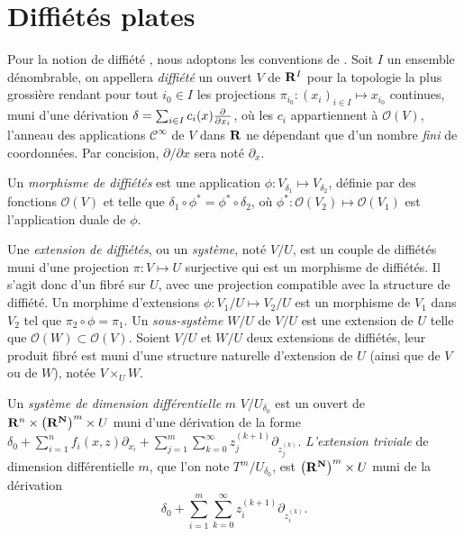 \documentclass[A4paper, 12pt]{article}
\def\cC{{\mathcal C}}
\def\cO{{\mathcal O}}
\def\N{{\bf N}}
\def\R{{\bf R}}
\def\textem#1{{\em #1\/}}
\begin{document}
\section{Diffiétés plates}

\noindent 
Pour la notion de diffiété \cite{vinogradov,zharinov}, nous adoptons les
conventions de \cite{OllivierSadik2006a}.
Soit $I$ un ensemble dénombrable, on appellera
\textem{diffiété} un ouvert $V$ de $\R^{I}$ pour la topologie la
plus grossière rendant pour tout $i_{0}\in I$ les projections
$\pi_{i_{0}}:(x_{i})_{i\in I}\mapsto x_{i_{0}}$ continues, muni d'une
dérivation $\delta=\sum_{i\in I} c_{i}(x){\partial\over\partial
x_{i}}$, où les $c_{i}$ appartiennent
à $\cO(V)$, l'anneau des applications $\cC^{\infty}$ de $V$ dans
$\R$ ne dépendant que d'un nombre \textem{fini} de
coordonnées. Par concision, $\partial/\partial x$ sera noté $\partial_{x}$.

Un \textem{morphisme de diffiétés} est une application
$\phi:V_{\delta_{1}}\mapsto V_{\delta_{2}}$, définie par des
fonctions $\cO(V)$ et telle que
$\delta_{1}\circ\phi^{\ast}=\phi^{\ast}\circ\delta_{2}$, où
$\phi^{\ast}:\cO(V_{2})\mapsto\cO(V_{1})$ est l'application duale de
$\phi$.

Une \textem{extension de diffiétés}, ou un \textem{système}, noté
$V/U$, est un couple de diffiétés muni d'une projection $\pi:V\mapsto
U$ surjective qui est un morphisme de diffiétés. Il s'agit donc d'un
fibré sur $U$, avec une projection compatible avec la structure de
diffiété.  Un morphime d'extensions $\phi:V_{1}/U\mapsto V_{2}/U$ est
un morphisme de $V_{1}$ dans $V_{2}$ tel que
$\pi_{2}\circ\phi=\pi_{1}$.  Un \textem{sous-système} $W/U$ de $V/U$
est une extension de $U$ telle que $\cO(W)\subset\cO(V)$. Soient $V/U$
et $W/U$ deux extensions de diffiétés, leur produit fibré est muni
d'une structure naturelle d'extension de $U$ (ainsi que de $V$ ou de
$W$), notée $V\times_{U} W$.

Un \textem{système de dimension différentielle} $m$
$V/U_{\delta_{0}}$ est un ouvert de
$\R^{n}\times\left(\R^{\N}\right)^{m}\times U$ muni d'une dérivation
de la forme $\delta_{0}+\sum_{i=1}^{n}f_{i}(x,z)\partial_{x_{i}}+\sum_{j=1}^{m}\sum_{k=0}^{\infty} 
z_{j}^{(k+1)}\partial_{z_{j}^{(k)}}$. 
\textem{L'extension triviale} de dimension différentielle $m$, que
l'on note $T^{m}/U_{\delta_{0}}$, est $\left(\R^{\N}\right)^{m}\times U$ muni
de la dérivation $$\delta_{0}+\sum_{i=1}^{m}\sum_{k=0}^{\infty}
z_{i}^{(k+1)}\partial_{z_{i}^{(k)}}.$$ 
\smallskip
\end{document}
